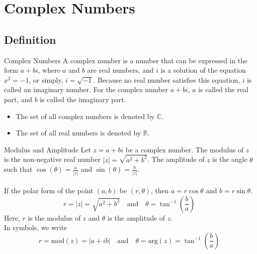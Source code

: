 
\section{Complex Numbers}
\subsection{Definition}

\begin{definition}{Complex Numbers}{}
    A complex number is a number that can be expressed in the form $a + bi$, where $a$ and $b$ are real numbers, and $i$ is a solution of the equation $x^2 = -1$, or simply, $i=\sqrt{-1}$. Because no real number satisfies this equation, $i$ is called an imaginary number. For the complex number $a + bi$, $a$ is called the real part, and $b$ is called the imaginary part. 
\end{definition}
\begin{note}{}{}
    \begin{itemize}
        \item The set of all complex numbers is denoted by $\mathbb{C}$.
        \item The set of all real numbers is denoted by $\mathbb{R}$.
    \end{itemize}
\end{note}

\begin{definition}{Modulus and Amplitude}{}
    Let $z = a + bi$ be a complex number. The modulus of $z$ is the non-negative real number $|z| = \sqrt{a^2 + b^2}$. The amplitude of $z$ is the angle $\theta$ such that $\cos(\theta) = \frac{a}{|z|}$ and $\sin(\theta) = \frac{b}{|z|}$. \\~\\
    If the polar form of the point $(a,b)$ be $(r,\theta)$, then $a = r\cos\theta$ and $b = r\sin\theta$.
    \begin{equation}
        r = |z| = \sqrt{a^2 + b^2} \quad \text{and} \quad \theta = \tan^{-1}\left(\frac{b}{a}\right)
    \end{equation}
    Here, $r$ is the modulus of $z$ and $\theta$ is the amplitude of $z$. \\
    In symbols, we write
    \begin{equation}
        r = \text{mod} (z) = |a+ib| \quad \text{and} \quad \theta = \text{arg} (z) = \tan^{-1}\left(\frac{b}{a}\right)
    \end{equation}
\end{definition}

